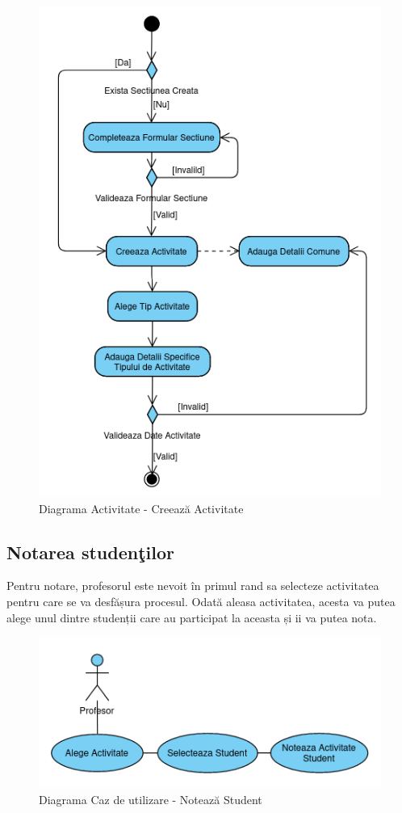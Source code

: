 \documentclass[12pt, a4paper, oneside, romanian]{teza-upb}
\begin{document}
\begin{figure}[H]
\centering
\includegraphics*[width=0.65\columnwidth]{diagrama-activitate-creeaza-activitate}
\caption{Diagrama Activitate - Creează Activitate}
\label{diagrama-activitate-creeaza-activitate}
\end{figure}

\subsection{Notarea studenţilor}

Pentru notare, profesorul este nevoit în primul rand sa selecteze activitatea pentru care se va desfășura procesul. Odată aleasa activitatea, acesta va putea alege unul dintre studenții care au participat la aceasta și ii va putea nota.

\begin{figure}[H]
\centering
\includegraphics*[width=0.65\columnwidth]{diagrama-use-case-noteaza-student}
\caption{Diagrama Caz de utilizare - Notează Student}
\label{diagrama-use-case-noteaza-student}
\end{figure}
\end{document}
